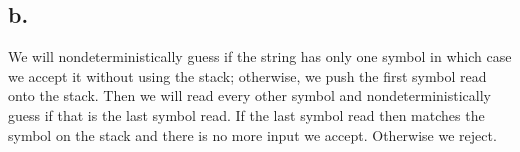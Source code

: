 \documentclass{scrartcl}
\begin{document}
\subsection*{b.}
We will nondeterministically guess if the string has only one symbol in which case we accept it without using the stack;  otherwise, we push the first
symbol read onto the stack. Then we will read every other symbol and nondeterministically guess if that is the last symbol read. If the last symbol read then matches the symbol on the stack and there is no more input we accept. Otherwise we reject.
\\
\\
\\
\end{document}
